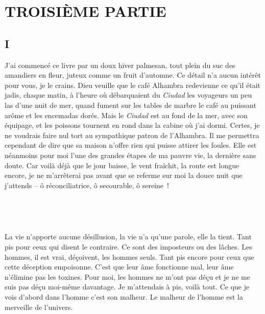 \documentclass[french,twoside]{book} %
\newcommand{\astertri}{\medskip\par\centerline{\color{rubric}\large\selectfont{\syms ✻\,✻\,✻}}\medskip\par}%
\begin{document}
\section[{TROISIÈME PARTIE}]{TROISIÈME PARTIE}\renewcommand{\leftmark}{TROISIÈME PARTIE}

\subsection[{I}]{I}
\noindent J’ai commencé ce livre par un doux hiver palmesan, tout plein du suc des amandiers en fleur, juteux comme un fruit d’automne. Ce détail n’a aucun intérêt pour vous, je le crains. Dieu veuille que le café Alhambra redevienne ce qu’il était jadis, chaque matin, à l’heure où débarquaient du \emph{Ciudad} les voyageurs un peu las d’une nuit de mer, quand fument sur les tables de marbre le café au puissant arôme et les encemadas dorés. Mais le \emph{Ciudad} est au fond de la mer, avec son équipage, et les poissons tournent en rond dans la cabine où j’ai dormi. Certes, je ne voudrais faire nul tort au sympathique patron de l’Alhambra. Il me permettra cependant de dire que sa maison n’offre rien qui puisse attirer les foules. Elle est néanmoins pour moi l’une des grandes étapes de ma pauvre vie, la dernière sans doute. Car voilà déjà que le jour baisse, le vent fraîchit, la route est longue encore, je ne m’arrêterai pas avant que se referme sur moi la douce nuit que j’attends – ô réconciliatrice, ô secourable, ô sereine !\par
 \par

\astertri

\noindent  \par
La vie n’apporte aucune désillusion, la vie n’a qu’une parole, elle la tient. Tant pis pour ceux qui disent le contraire. Ce sont des imposteurs ou des lâches. Les hommes, il est vrai, déçoivent, les hommes seuls. Tant pis encore pour ceux que cette déception empoisonne. C’est que leur âme fonctionne mal, leur âme n’élimine pas les toxines. Pour moi, les hommes ne m’ont pas déçu et je ne me suis pas déçu moi-même davantage. Je m’attendais à pis, voilà tout. Ce que je vois d’abord dans l’homme c’est son malheur. Le malheur de l’homme est la merveille de l’univers.\par
 \par

\astertri
\end{document}
